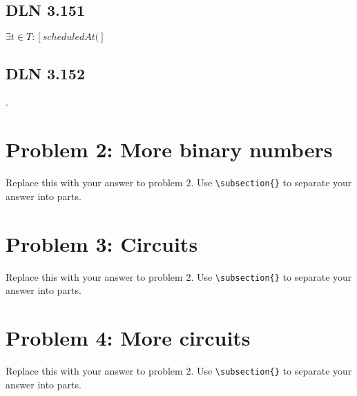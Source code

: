 \documentclass[titlepage]{article}
\begin{document}
\subsection{DLN 3.151}

\( \exists t \in T: \left[ scheduledAt(   \right] \)

\subsection{DLN 3.152} 

.

\section{Problem 2: More binary numbers}

Replace this with your answer to problem 2.  Use \verb|\subsection{}| to separate your answer into parts.

\section{Problem 3: Circuits}

Replace this with your answer to problem 2.  Use \verb|\subsection{}| to separate your answer into parts.

\section{Problem 4: More circuits}

Replace this with your answer to problem 2.  Use \verb|\subsection{}| to separate your answer into parts.
\end{document}
